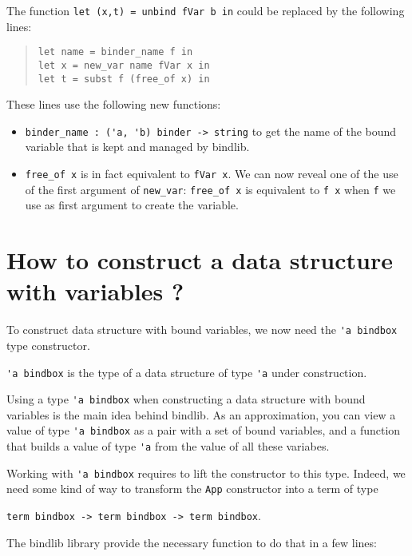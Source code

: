 \documentclass[11pt]{article}
\begin{document}
The function \verb!let (x,t) = unbind fVar b in! could be replaced by the following lines:
\begin{quote}
\begin{verbatim}
let name = binder_name f in
let x = new_var name fVar x in
let t = subst f (free_of x) in
\end{verbatim}
\end{quote}


These lines use the following new functions:

\begin{itemize}
\item \verb#binder_name : ('a, 'b) binder -> string# to get the name
  of the bound variable that is kept and managed by bindlib.


\item \verb#free_of x# is in fact equivalent to \verb#fVar x#.
We can now reveal one of the use of the first argument of
\verb#new_var#: \verb#free_of x# is equivalent to \verb#f x# when
\verb#f# we use as first argument to create the variable.

\end{itemize}


\section{How to construct a data structure with variables ?}

To construct data structure with bound variables, we now need the
\verb!'a bindbox!
type constructor.

\verb!'a bindbox! is the type of a data structure of type \verb#'a# under
construction.

Using a type \verb!'a bindbox! when constructing a data structure with
bound variables is the main idea behind bindlib. As an approximation,
you can view a value of type \verb!'a bindbox! as a pair with a set
of bound variables, and a function that builds a value of type \verb!'a!
from the value of all these variabes.

Working with \verb!'a bindbox! requires to lift the constructor to
this type. Indeed, we need some kind of way to transform the
\verb!App! constructor into a term of type
\begin{center}
  \verb!term bindbox -> term bindbox -> term bindbox!.
\end{center}
The bindlib library
provide the necessary function to do that in a few lines:
\end{document}
